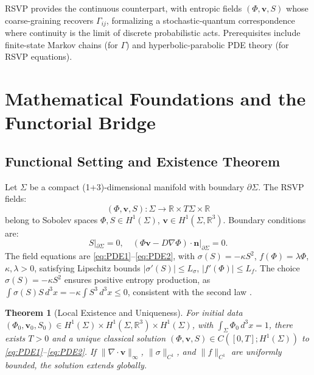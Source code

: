 \documentclass[12pt]{article}
\newtheorem{theorem}{Theorem}
\begin{document}
RSVP provides the continuous counterpart, with entropic fields \((\Phi, \mathbf{v}, S)\) whose coarse-graining recovers \(\Gamma_{ij}\), formalizing a stochastic-quantum correspondence where continuity is the limit of discrete probabilistic acts. Prerequisites include finite-state Markov chains (for \(\Gamma\)) and hyperbolic-parabolic PDE theory (for RSVP equations).

\section{Mathematical Foundations and the Functorial Bridge}

\subsection{Functional Setting and Existence Theorem}

Let \(\Sigma\) be a compact (1+3)-dimensional manifold with boundary \(\partial \Sigma\). The RSVP fields:
\[
(\Phi, \mathbf{v}, S): \Sigma \to \mathbb{R} \times T\Sigma \times \mathbb{R}
\]
belong to Sobolev spaces \(\Phi, S \in H^1(\Sigma)\), \(\mathbf{v} \in H^1(\Sigma, \mathbb{R}^3)\). Boundary conditions are:
\[
S|_{\partial \Sigma} = 0, \quad (\Phi \mathbf{v} - D \nabla \Phi) \cdot \mathbf{n}|_{\partial \Sigma} = 0.
\]
The field equations are \eqref{eq:PDE1}--\eqref{eq:PDE2}, with \(\sigma(S) = -\kappa S^2\), \(f(\Phi) = \lambda \Phi\), \(\kappa, \lambda > 0\), satisfying Lipschitz bounds \(|\sigma'(S)| \leq L_\sigma\), \(|f'(\Phi)| \leq L_f\). The choice \(\sigma(S) = -\kappa S^2\) ensures positive entropy production, as \(\int \sigma(S) S \, d^3x = -\kappa \int S^3 \, d^3x \leq 0\), consistent with the second law \citep{Seifert2012}.

\begin{theorem}[Local Existence and Uniqueness]
\label{thm:wellposed}
For initial data \((\Phi_0, \mathbf{v}_0, S_0) \in H^1(\Sigma) \times H^1(\Sigma, \mathbb{R}^3) \times H^1(\Sigma)\), with \(\int_\Sigma \Phi_0 \, d^3x = 1\), there exists \(T > 0\) and a unique classical solution \((\Phi, \mathbf{v}, S) \in C([0, T]; H^1(\Sigma))\) to \eqref{eq:PDE1}--\eqref{eq:PDE2}. If \(\|\nabla \cdot \mathbf{v}\|_\infty\), \(\|\sigma\|_{C^1}\), and \(\|f\|_{C^1}\) are uniformly bounded, the solution extends globally.
\end{theorem}
\end{document}
